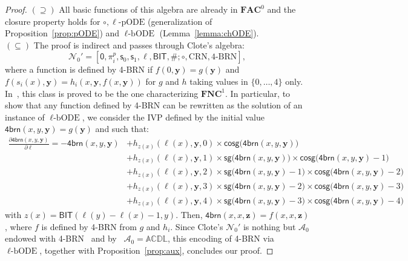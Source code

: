 \documentclass[11pt, oneside]{article}
\newcommand{\ACDL}{\mathbb{ACDL}}
\newcommand{\fun}[1]{\mathsf{#1}}
\newcommand{\NC}{\mathbf{FNC}}
\newcommand{\AC}{\mathbf{FAC}}
\newcommand{\tu}[1]{\mathbf{#1}}
\theoremstyle{definition}
\newcommand{\chODE}{\ell\text{-bODE}}
\newcommand{\pODE}{\ell\text{-pODE}}
\begin{document}
\begin{proof}
    $(\supseteq)$ All basic functions of this algebra are already in $\AC^0$ and the closure property holds for $\circ, \pODE$ (generalization of Proposition~\ref{prop:pODE}) and $\chODE$ (Lemma~\ref{lemma:chODE}). 
    \\
    $(\subseteq)$ The proof is indirect and passes through Clote's algebra:
    $$
    \mathcal{N}_0' = [\fun{0}, \pi^p_i, \fun{s}_0, \fun{s}_1, \ell, \fun{BIT}, \#; \circ, \text{CRN}, \text{4-BRN}],
    $$
    where a function is defined by 4-BRN if $f(0, \tu y)=g(\tu y)$ and $f(s_i(x), \tu y)=h_i(x, \tu y, f(x, \tu y))$ for $g$ and $h$ taking values in $\{0,\dots, 4\}$ only.
    In~\cite{Clote93}, this class is proved to be the one characterizing $\NC^1$. 
    In particular, to show that any function defined by 4-BRN %
    can be rewritten as the solution of an instance of $\chODE$, we consider the IVP defined by the initial value $\fun{4brn}(x,y,\tu y)=g(\tu y)$ and such that:
    \footnotesize
    \begin{align*}
        \frac{\partial \fun{4brn}(x, y, \tu y)}{\partial \ell} = -\fun{4brn}(x, y, \tu y) &+ h_{z(x)}(\ell(x), \tu y, 0) \times \fun{cosg}\big(\fun{4brn}(x, y, \tu y)\big) \\
        & + h_{z(x)}(\ell(x), \tu y, 1) \times \fun{sg}\big(\fun{4brn}(x, y, \tu y)\big) \times \fun{cosg}\big(\fun{4brn}(x, y, \tu y) - 1\big) \\
        & + h_{z(x)}(\ell(x), \tu y, 2) \times \fun{sg}\big(\fun{4brn}(x, y, \tu y) - 1\big)\times \fun{cosg}\big(\fun{4brn}(x,y,\tu y)-2\big) \\
        &+ h_{z(x)}(\ell(x), \tu y, 3) \times   \fun{sg}\big(\fun{4brn}(x,y,\tu y) - 2\big) \times \fun{cosg}\big(\fun{4brn}(x, y, \tu y) - 3\big) \\
        &+ h_{z(x)}(\ell(x), \tu y, 4) \times \fun{sg}\big(\fun{4brn}(x,y,\tu y) - 3\big) \times \fun{cosg}\big(\fun{4brn}(x, y, \tu y) - 4\big)
    \end{align*}
    \normalsize
    \noindent
    with $z(x)=\fun{BIT}(\ell(y)-\ell(x)-1, y)$.
    Then, $\fun{4brn}(x,x,\tu z)=f(x,x,\tu z)$, where $f$ is defined by 4-BRN from $g$ and $h_i$.
    Since Clote's $\mathcal{N}_0'$ is nothing but $\mathcal{A}_0$ endowed with 4-BRN~\cite{Clote93} and by~\cite{ADK24a} $\mathcal{A}_0=\ACDL$, this encoding of 4-BRN via $\chODE$, together with Proposition~\ref{prop:aux}, concludes our proof.
\end{proof}
\end{document}
